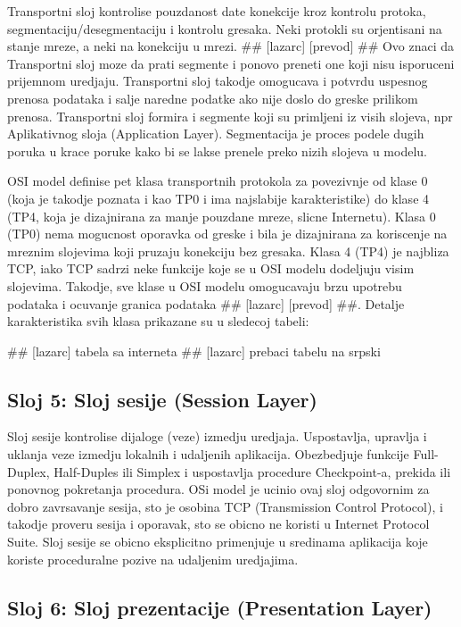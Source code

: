 \documentclass[a4paper,12pt, master]{etf}
\begin{document}
	Transportni sloj kontrolise pouzdanost date konekcije kroz kontrolu protoka,
	segmentaciju/desegmentaciju i kontrolu gresaka. Neki protokli su orjentisani na stanje 
	mreze, a neki na konekciju u mrezi. \#\# [lazarc] [prevod] \#\# Ovo znaci da Transportni 
	sloj moze da prati segmente i ponovo preneti one koji nisu isporuceni prijemnom uredjaju. 
	Transportni sloj takodje omogucava i potvrdu uspesnog prenosa podataka i salje naredne 
	podatke ako nije doslo do greske prilikom prenosa. Transportni sloj formira i segmente 
	koji su primljeni iz visih slojeva, npr Aplikativnog sloja (Application Layer). 
	Segmentacija je proces podele dugih poruka u krace poruke kako bi se lakse prenele preko 
	nizih slojeva u modelu.

	OSI model definise pet klasa transportnih protokola za povezivnje od klase 0 (koja je 
	takodje poznata i kao TP0 i ima najslabije karakteristike) do klase 4 (TP4, koja je 
	dizajnirana za manje pouzdane mreze, slicne Internetu). Klasa 0 (TP0) nema mogucnost 
	oporavka od greske i bila je dizajnirana za koriscenje na mreznim slojevima koji pruzaju 
	konekciju bez gresaka. Klasa 4 (TP4) je najbliza TCP, iako TCP sadrzi neke funkcije koje 
	se u OSI modelu dodeljuju visim slojevima. Takodje, sve klase u OSI modelu omogucavaju 
	brzu upotrebu podataka i ocuvanje granica podataka \#\# [lazarc] [prevod] \#\#. Detalje 
	karakteristika svih klasa prikazane su u sledecoj tabeli:

	\#\# [lazarc] tabela sa interneta
	\#\# [lazarc] prebaci tabelu na srpski

	\subsection{Sloj 5: Sloj sesije (Session Layer)}

	Sloj sesije kontrolise dijaloge (veze) izmedju uredjaja. Uspostavlja, upravlja i uklanja 
	veze izmedju lokalnih i udaljenih aplikacija. Obezbedjuje funkcije Full-Duplex, 
	Half-Duples ili	Simplex i uspostavlja procedure Checkpoint-a, prekida ili ponovnog 
	pokretanja procedura. OSi model je ucinio ovaj sloj odgovornim za dobro zavrsavanje sesija,
	sto je osobina TCP (Transmission Control Protocol), i takodje proveru sesija i oporavak, 
	sto se obicno ne koristi u Internet Protocol Suite. Sloj sesije se obicno eksplicitno 
	primenjuje u sredinama aplikacija koje koriste proceduralne pozive na udaljenim uredjajima.

	\subsection{Sloj 6: Sloj prezentacije (Presentation Layer)}
\end{document}
